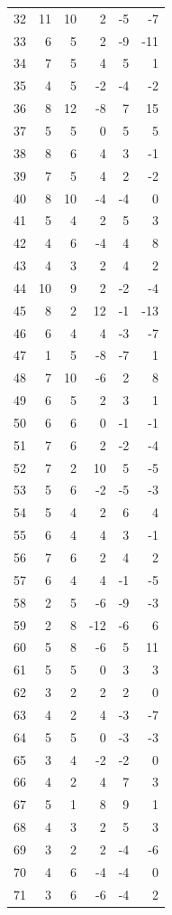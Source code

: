 \documentclass[11pt]{article}
\begin{document}
\begin{center}
\begin{longtable}{r r r r r r}
32 & 11 & 10 & 2 & -5 & -7\\
33 & 6 & 5 & 2 & -9 & -11\\
34 & 7 & 5 & 4 & 5 & 1\\
35 & 4 & 5 & -2 & -4 & -2\\
36 & 8 & 12 & -8 & 7 & 15\\
37 & 5 & 5 & 0 & 5 & 5\\
38 & 8 & 6 & 4 & 3 & -1\\
39 & 7 & 5 & 4 & 2 & -2\\
40 & 8 & 10 & -4 & -4 & 0\\
41 & 5 & 4 & 2 & 5 & 3\\
42 & 4 & 6 & -4 & 4 & 8\\
43 & 4 & 3 & 2 & 4 & 2\\
44 & 10 & 9 & 2 & -2 & -4\\
45 & 8 & 2 & 12 & -1 & -13\\
46 & 6 & 4 & 4 & -3 & -7\\
47 & 1 & 5 & -8 & -7 & 1\\
48 & 7 & 10 & -6 & 2 & 8\\
49 & 6 & 5 & 2 & 3 & 1\\
50 & 6 & 6 & 0 & -1 & -1\\
51 & 7 & 6 & 2 & -2 & -4\\
52 & 7 & 2 & 10 & 5 & -5\\
53 & 5 & 6 & -2 & -5 & -3\\
54 & 5 & 4 & 2 & 6 & 4\\
55 & 6 & 4 & 4 & 3 & -1\\
56 & 7 & 6 & 2 & 4 & 2\\
57 & 6 & 4 & 4 & -1 & -5\\
58 & 2 & 5 & -6 & -9 & -3\\
59 & 2 & 8 & -12 & -6 & 6\\
60 & 5 & 8 & -6 & 5 & 11\\
61 & 5 & 5 & 0 & 3 & 3\\
62 & 3 & 2 & 2 & 2 & 0\\
63 & 4 & 2 & 4 & -3 & -7\\
64 & 5 & 5 & 0 & -3 & -3\\
65 & 3 & 4 & -2 & -2 & 0\\
66 & 4 & 2 & 4 & 7 & 3\\
67 & 5 & 1 & 8 & 9 & 1\\
68 & 4 & 3 & 2 & 5 & 3\\
69 & 3 & 2 & 2 & -4 & -6\\
70 & 4 & 6 & -4 & -4 & 0\\
71 & 3 & 6 & -6 & -4 & 2\\

\end{longtable}
\end{center}
\end{document}
